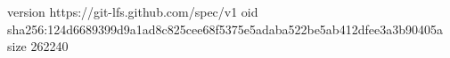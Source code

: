 version https://git-lfs.github.com/spec/v1
oid sha256:124d6689399d9a1ad8c825cee68f5375e5adaba522be5ab412dfee3a3b90405a
size 262240
